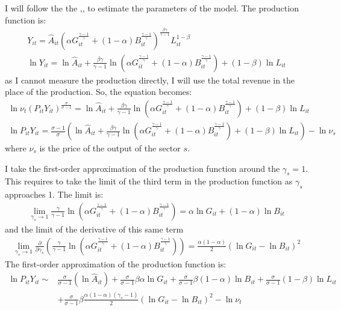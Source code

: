I will follow the the \cite{kmenta1967estimation},\cite{blundell2000gmm},\cite{davis2014macroeconomic} to estimate the parameters of the model. The production function is:
\begin{gather*}
    Y_{it} = \hat{A}_{it}(
        \alpha G_{it}^{\frac{\gamma-1}{\gamma}} + (1-\alpha) B_{it}^{\frac{\gamma-1}{\gamma}}
    ) ^ {\frac{\beta\gamma}{\gamma-1}} L_{it}^{1-\beta}\\
    \ln Y_{it} = \ln \hat{A}_{it} + \frac{\beta\gamma}{\gamma-1} \ln(
        \alpha G_{it}^{\frac{\gamma-1}{\gamma}} + (1-\alpha) B_{it}^{\frac{\gamma-1}{\gamma}}
    ) + (1-\beta) \ln L_{it}
\end{gather*}
as I cannot measure the production directly, I will use the total revenue in the place of the production. So, the equation becomes:
\begin{gather*}
    \ln \nu_{t}(P_{it}Y_{it})^{\frac{\sigma}{\sigma - 1}} = \ln \hat{A}_{it} + \frac{\beta\gamma}{\gamma-1} \ln(
        \alpha G_{it}^{\frac{\gamma-1}{\gamma}} + (1-\alpha) B_{it}^{\frac{\gamma-1}{\gamma}}
    ) + (1-\beta) \ln L_{it}\\
    \ln P_{it}Y_{it} = \frac{\sigma - 1}{\sigma}({\ln \hat{A}_{it} + \frac{\beta\gamma}{\gamma-1} \ln(
        \alpha G_{it}^{\frac{\gamma-1}{\gamma}} + (1-\alpha) B_{it}^{\frac{\gamma-1}{\gamma}}
    ) + (1-\beta) \ln L_{it}}) - \ln \nu_{s}
\end{gather*}
where $\nu_{s}$ is the price of the output of the sector $s$.

I take the first-order approximation of the production function around the $\gamma_s = 1$. This requires to take the limit of the third term in the production function as $\gamma_s$ approaches 1. The limit is:
\begin{gather*}
    \lim_{\gamma_s \to 1} \frac{\gamma}{\gamma-1} \ln(
        \alpha G_{it}^{\frac{\gamma-1}{\gamma}} + (1-\alpha) B_{it}^{\frac{\gamma-1}{\gamma}}
    ) = \alpha \ln G_{it}   + (1-\alpha)\ln B_{it}
\end{gather*}
and the limit of the derivative of this same term
\begin{gather*}
    \lim_{\gamma_s \to 1} \frac{\partial}{\partial \gamma_s} \left( \frac{\gamma}{\gamma-1} \ln(
        \alpha G_{it}^{\frac{\gamma-1}{\gamma}} + (1-\alpha) B_{it}^{\frac{\gamma-1}{\gamma}}
    ) \right) =  \frac{\alpha (1-\alpha)}{2}(\ln G_{it} - \ln B_{it})^2
\end{gather*}
The first-order approximation of the production function is:
\begin{equation*}
     \begin{split}
        \ln P_{it}Y_{it} \sim  & \frac{\sigma}{\sigma-1}(\ln \hat{A}_{it}) +  \frac{\sigma}{\sigma-1}\beta\alpha \ln G_{it}   + \frac{\sigma}{\sigma-1}\beta(1-\alpha)\ln B_{it} + \frac{\sigma}{\sigma-1}(1-\beta) \ln L_{it} \\
         & + \frac{\sigma}{\sigma-1}\beta \frac{\alpha (1-\alpha)(\gamma_s - 1)}{2}(\ln G_{it} - \ln B_{it})^2 - \ln \nu_{t}
    \end{split}
\end{equation*}

